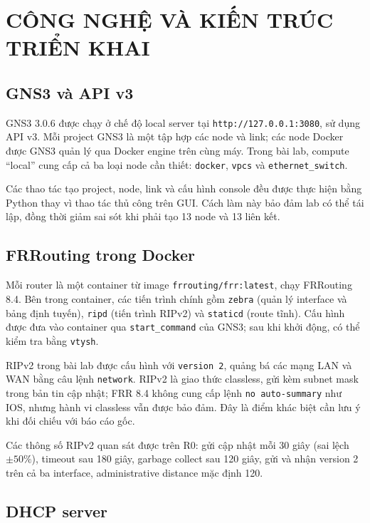 \documentclass[12pt,a4paper]{article}
\begin{document}
\section{CÔNG NGHỆ VÀ KIẾN TRÚC TRIỂN KHAI}

\subsection{GNS3 và API v3}

GNS3 3.0.6 được chạy ở chế độ local server tại \texttt{http://127.0.0.1:3080}, sử dụng API v3.
Mỗi project GNS3 là một tập hợp các node và link; các node Docker được GNS3 quản lý qua Docker
engine trên cùng máy. Trong bài lab, compute ``local'' cung cấp cả ba loại node cần thiết:
\texttt{docker}, \texttt{vpcs} và \texttt{ethernet\_switch}.

Các thao tác tạo project, node, link và cấu hình console đều được thực hiện bằng Python thay vì
thao tác thủ công trên GUI. Cách làm này bảo đảm lab có thể tái lập, đồng thời giảm sai sót khi
phải tạo 13 node và 13 liên kết.

\subsection{FRRouting trong Docker}

Mỗi router là một container từ image \texttt{frrouting/frr:latest}, chạy FRRouting 8.4. Bên trong
container, các tiến trình chính gồm \texttt{zebra} (quản lý interface và bảng định tuyến),
\texttt{ripd} (tiến trình RIPv2) và \texttt{staticd} (route tĩnh). Cấu hình được đưa vào container
qua \texttt{start\_command} của GNS3; sau khi khởi động, có thể kiểm tra bằng \texttt{vtysh}.

RIPv2 trong bài lab được cấu hình với \texttt{version 2}, quảng bá các mạng LAN và WAN bằng câu
lệnh \texttt{network}. RIPv2 là giao thức classless, gửi kèm subnet mask trong bản tin cập nhật;
FRR 8.4 không cung cấp lệnh \texttt{no auto-summary} như IOS, nhưng hành vi classless vẫn được
bảo đảm. Đây là điểm khác biệt cần lưu ý khi đối chiếu với báo cáo gốc.

Các thông số RIPv2 quan sát được trên R0: gửi cập nhật mỗi 30 giây (sai lệch $\pm 50\%$), timeout
sau 180 giây, garbage collect sau 120 giây, gửi và nhận version 2 trên cả ba interface, administrative
distance mặc định 120.

\subsection{DHCP server}
\end{document}
